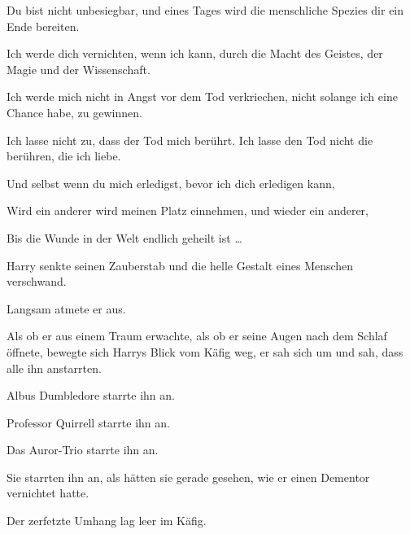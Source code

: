 \begin{em}
Du bist nicht unbesiegbar, und eines Tages wird die menschliche Spezies dir ein Ende bereiten.

Ich werde dich vernichten, wenn ich kann, durch die Macht des Geistes, der Magie und der Wissenschaft.

Ich werde mich nicht in Angst vor dem Tod verkriechen, nicht solange ich eine Chance habe, zu gewinnen.

Ich lasse nicht zu, dass der Tod mich berührt. Ich lasse den Tod nicht die berühren, die ich liebe.

Und selbst wenn du mich erledigst, bevor ich dich erledigen kann,

Wird ein anderer wird meinen Platz einnehmen, und wieder ein anderer,

Bis die Wunde in der Welt endlich geheilt ist …
\end{em}

Harry senkte seinen Zauberstab und die helle Gestalt eines Menschen verschwand.

Langsam atmete er aus.

Als ob er aus einem Traum erwachte, als ob er seine Augen nach dem Schlaf öffnete, bewegte sich Harrys Blick vom Käfig weg, er sah sich um und sah, dass alle ihn anstarrten.

Albus Dumbledore starrte ihn an.

Professor Quirrell starrte ihn an.

Das Auror-Trio starrte ihn an.

Sie starrten ihn an, als hätten sie gerade gesehen, wie er einen Dementor vernichtet hatte.

Der zerfetzte Umhang lag leer im Käfig.

